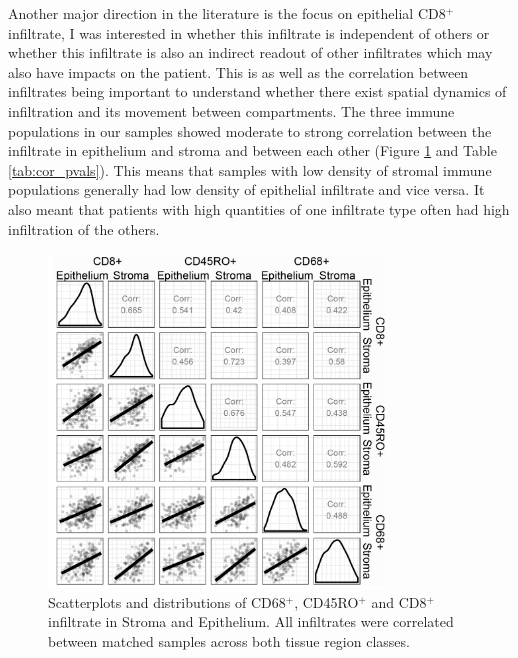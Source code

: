 Another major direction in the literature is the focus on epithelial CD8$^+$ infiltrate, I was interested in whether this infiltrate is independent of others or whether this infiltrate is also an indirect readout of other infiltrates which may also have impacts on the patient. This is as well as the correlation between infiltrates being important to understand whether there exist spatial dynamics of infiltration and its movement between compartments. The three immune populations in our samples showed moderate to strong correlation between the infiltrate in epithelium and stroma and between each other (Figure \ref{fig:ch2_correlation} and Table \ref{tab:cor_pvals}). This means that samples with low density of stromal immune populations generally had low density of epithelial infiltrate and vice versa. It also meant that patients with high quantities of one infiltrate type often had high infiltration of the others.

\begin{figure}
    \centering
    \includegraphics[width=0.8\textwidth]{Chapter2/Figs/Raster/correlation_inf.png}
    \caption[Correlation between infiltrates]{Scatterplots and distributions of CD68$^+$, CD45RO$^+$ and CD8$^+$ infiltrate in Stroma and Epithelium. All infiltrates were correlated between matched samples across both tissue region classes.}
    \label{fig:ch2_correlation}
\end{figure}

